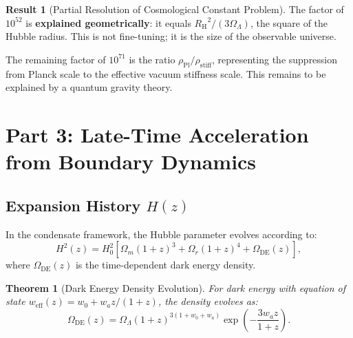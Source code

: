 \documentclass[11pt,a4paper]{article}
\newcommand{\rhostiff}{\ensuremath{\rho_{\mathrm{stiff}}}}
\newcommand{\rhoPl}{\ensuremath{\rho_{\mathrm{Pl}}}}
\newcommand{\RH}{\ensuremath{R_{\mathrm{H}}}}
\newcommand{\weff}{\ensuremath{w_{\mathrm{eff}}}}
\newcommand{\OmegaLam}{\ensuremath{\Omega_\Lambda}}
\newcommand{\OmegaM}{\ensuremath{\Omega_m}}
\newtheorem{theorem}{Theorem}[section]
\theoremstyle{definition}
\newtheorem{result}{Result}
\theoremstyle{remark}
\begin{document}
\begin{result}[Partial Resolution of Cosmological Constant Problem]
\label{result:cc_partial}
The factor of $10^{52}$ is \textbf{explained geometrically}: it equals $\RH^2/(3\OmegaLam)$, the square of the Hubble radius. This is not fine-tuning; it is the size of the observable universe.

The remaining factor of $10^{71}$ is the ratio $\rhoPl/\rhostiff$, representing the suppression from Planck scale to the effective vacuum stiffness scale. This remains to be explained by a quantum gravity theory.
\end{result}

\section{Part 3: Late-Time Acceleration from Boundary Dynamics}
\label{sec:acceleration}

\subsection{Expansion History $H(z)$}
\label{sec:Hz}

In the condensate framework, the Hubble parameter evolves according to:
\begin{equation}
\label{eq:Hz_condensate}
H^2(z) = H_0^2\left[\OmegaM(1+z)^3 + \Omega_r(1+z)^4 + \Omega_{\mathrm{DE}}(z)\right],
\end{equation}
where $\Omega_{\mathrm{DE}}(z)$ is the time-dependent dark energy density.

\begin{theorem}[Dark Energy Density Evolution]
\label{thm:DE_evolution}
For dark energy with equation of state $\weff(z) = w_0 + w_a z/(1+z)$, the density evolves as:
\begin{equation}
\label{eq:OmegaDE_z}
\boxed{\Omega_{\mathrm{DE}}(z) = \OmegaLam(1+z)^{3(1+w_0+w_a)}\exp\left(-\frac{3w_a z}{1+z}\right).}
\end{equation}
\end{theorem}
\end{document}
